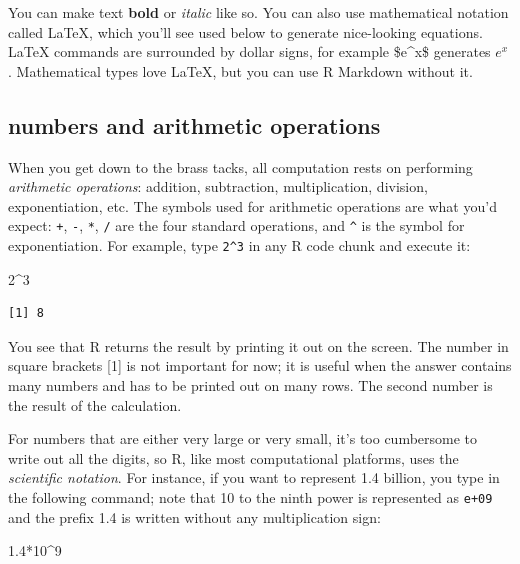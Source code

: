 \documentclass[
  letterpaper,
  DIV=11,
  numbers=noendperiod]{scrreprt}
\newenvironment{Shaded}{\begin{snugshade}}{\end{snugshade}}
\newcommand{\DecValTok}[1]{\textcolor[rgb]{0.68,0.00,0.00}{#1}}
\newcommand{\FloatTok}[1]{\textcolor[rgb]{0.68,0.00,0.00}{#1}}
\newcommand{\SpecialCharTok}[1]{\textcolor[rgb]{0.37,0.37,0.37}{#1}}
\begin{document}
You can make text \textbf{bold} or \emph{italic} like so. You can also
use mathematical notation called LaTeX, which you'll see used below to
generate nice-looking equations. LaTeX commands are surrounded by dollar
signs, for example \$e\^{}x\$ generates \(e^x\). Mathematical types love
LaTeX, but you can use R Markdown without it.

\hypertarget{numbers-and-arithmetic-operations}{%
\subsection{numbers and arithmetic
operations}\label{numbers-and-arithmetic-operations}}

When you get down to the brass tacks, all computation rests on
performing  \emph{arithmetic
operations}: addition, subtraction, multiplication, division,
exponentiation, etc. The symbols used for arithmetic operations are what
you'd expect: \texttt{+}, \texttt{-}, \texttt{*}, \texttt{/} are the
four standard operations, and \texttt{\^{}} is the symbol for
exponentiation. For example, type \texttt{2\^{}3} in any R code chunk
and execute it:

\begin{Shaded}
\begin{Highlighting}[]
\DecValTok{2}\SpecialCharTok{\^{}}\DecValTok{3}
\end{Highlighting}
\end{Shaded}

\begin{verbatim}
[1] 8
\end{verbatim}

You see that R returns the result by printing it out on the screen. The
number in square brackets {[}1{]} is not important for now; it is useful
when the answer contains many numbers and has to be printed out on many
rows. The second number is the result of the calculation.

For numbers that are either very large or very small, it's too
cumbersome to write out all the digits, so R, like most computational
platforms, uses the
\emph{scientific notation}. For
instance, if you want to represent 1.4 billion, you type in the
following command; note that 10 to the ninth power is represented as
\texttt{e+09} and the prefix 1.4 is written without any multiplication
sign:

\begin{Shaded}
\begin{Highlighting}[]
\FloatTok{1.4}\SpecialCharTok{*}\DecValTok{10}\SpecialCharTok{\^{}}\DecValTok{9}
\end{Highlighting}
\end{Shaded}
\end{document}
